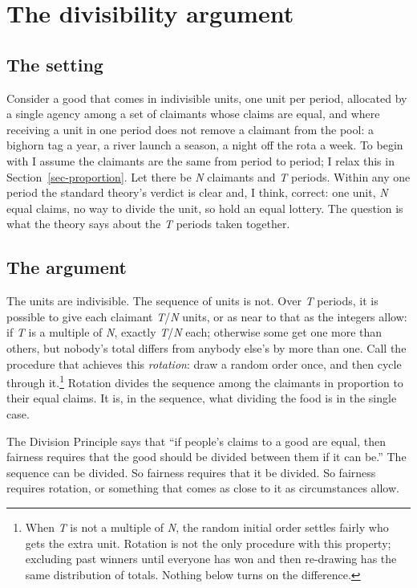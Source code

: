 \documentclass[
  11pt,
  letterpaper,
  DIV=11,
  numbers=noendperiod,
  twoside]{scrartcl}
\begin{document}
\section{The divisibility argument}\label{sec-division}

\subsection{The setting}\label{the-setting}

Consider a good that comes in indivisible units, one unit per period,
allocated by a single agency among a set of claimants whose claims are
equal, and where receiving a unit in one period does not remove a
claimant from the pool: a bighorn tag a year, a river launch a season, a
night off the rota a week. To begin with I assume the claimants are the
same from period to period; I relax this in
Section~\ref{sec-proportion}. Let there be \emph{N} claimants and
\emph{T} periods. Within any one period the standard theory's verdict is
clear and, I think, correct: one unit, \emph{N} equal claims, no way to
divide the unit, so hold an equal lottery. The question is what the
theory says about the \emph{T} periods taken together.

\subsection{The argument}\label{the-argument}

The units are indivisible. The sequence of units is not. Over \emph{T}
periods, it is possible to give each claimant \emph{T}/\emph{N} units,
or as near to that as the integers allow: if \emph{T} is a multiple of
\emph{N}, exactly \emph{T}/\emph{N} each; otherwise some get one more
than others, but nobody's total differs from anybody else's by more than
one. Call the procedure that achieves this \emph{rotation}: draw a
random order once, and then cycle through it.\footnote{When \emph{T} is
  not a multiple of \emph{N}, the random initial order settles fairly
  who gets the extra unit. Rotation is not the only procedure with this
  property; excluding past winners until everyone has won and then
  re-drawing has the same distribution of totals. Nothing below turns on
  the difference.} Rotation divides the sequence among the claimants in
proportion to their equal claims. It is, in the sequence, what dividing
the food is in the single case.

The Division Principle says that ``if people's claims to a good are
equal, then fairness requires that the good should be divided between
them if it can be.'' The sequence can be divided. So fairness requires
that it be divided. So fairness requires rotation, or something that
comes as close to it as circumstances allow.
\end{document}
